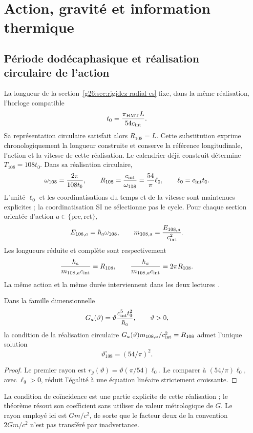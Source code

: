 \section{Action, gravité et information thermique}
\label{sec:gravity}
\subsection{Période dodécaphasique et réalisation circulaire de l'action}
La longueur de la section~\ref{g26:sec:rigidez-radial-es} fixe, dans
la même réalisation, l'horloge compatible
\[
 t_0=\frac{\pi_{\mathrm{HMT}}L}{54c_{\rm int}}.
\]
Sa représentation circulaire satisfait alors \(R_{108}=L\). Cette
substitution exprime chronologiquement la longueur construite et conserve
la référence longitudinale, l’action et la vitesse de cette réalisation.
Le calendrier déjà construit détermine $T_{108}=108t_0$.
Dans sa réalisation circulaire,
\[
\omega_{108}=\frac{2\pi}{108t_0},\qquad
R_{108}=\frac{c_{\rm int}}{\omega_{108}}
=\frac{54}{\pi}\ell_0,\qquad \ell_0=c_{\rm int}t_0.
\]
L’unité $\ell_0$ et les coordinatisations du temps et de la vitesse sont maintenues
explicites ; la coordinatisation SI ne sélectionne pas le cycle.
Pour chaque section orientée d’action $a\in\{\mathrm{pre},\mathrm{ret}\}$,
\[
E_{108,a}=\hbar_a\omega_{108},\qquad
m_{108,a}=\frac{E_{108,a}}{c_{\rm int}^2}.
\]
Les longueurs réduite et complète sont respectivement
\[
\frac{\hbar_a}{m_{108,a}c_{\rm int}}=R_{108},
\qquad
\frac{h_a}{m_{108,a}c_{\rm int}}=2\pi R_{108}.
\]
La même action et la même durée interviennent dans les deux lectures
\cite{autodual}.

\begin{proposition}
Dans la famille dimensionnelle
\[
G_a(\vartheta)=\vartheta\frac{c_{\rm int}^5t_0^2}{\hbar_a},
\qquad \vartheta>0,
\]
la condition de la réalisation circulaire
$G_a(\vartheta)m_{108,a}/c_{\rm int}^2=R_{108}$
admet l'unique solution
\[
\vartheta^\circ_{108}=(54/\pi)^2.
\]
\end{proposition}
\begin{proof}
Le premier rayon est
$r_g(\vartheta)=\vartheta(\pi/54)\ell_0$.
Le comparer à $(54/\pi)\ell_0$, avec $\ell_0>0$, réduit
l'égalité à une équation linéaire strictement croissante.
\end{proof}
La condition de coïncidence est une partie explicite de cette réalisation ;
le théorème résout son coefficient sans utiliser de valeur métrologique de $G$.
Le rayon employé ici est $Gm/c^2$, de sorte que le facteur deux
de la convention $2Gm/c^2$ n'est pas transféré par inadvertance.

